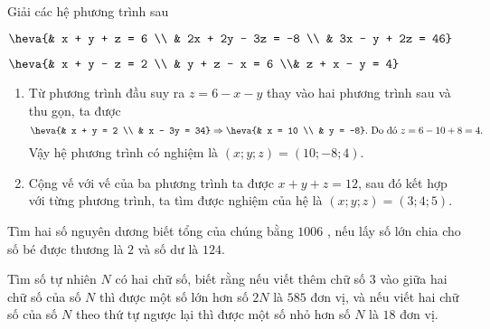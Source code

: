 \begin{bt}%
	Giải các hệ phương trình sau
	\begin{enumEX}{2}
	\item $\heva{& x + y + z = 6 \\ & 2x + 2y - 3z = -8 \\ & 3x - y + 2z = 46}$
	\item $\heva{& x + y - z = 2 \\ & y + z - x = 6 \\& z + x - y = 4}$
	\end{enumEX}	
	\loigiai
	{
	\begin{enumerate}
	\item Từ phương trình đầu suy ra $z = 6 - x - y$ thay vào hai phương trình sau và thu gọn, ta được $$\heva{& x + y = 2 \\ & x - 3y = 34} \Rightarrow \heva{& x = 10 \\ & y = -8}. \text{ Do đó }z = 6 - 10 + 8 = 4.$$
	Vậy hệ phương trình có nghiệm là $(x; y; z) = (10; -8; 4)$.
	\item Cộng vế với vế của ba phương trình ta được $x + y + z = 12$, sau đó kết hợp với từng phương trình, ta tìm được nghiệm của hệ là $(x; y; z) = (3; 4; 5)$. 
	\end{enumerate}
	}
\end{bt}
\begin{bt}
	Tìm hai số nguyên dương biết tổng của chúng bằng $1006$ , nếu lấy số lớn chia cho số bé được thương là $2$ và số dư là $124$.
\end{bt}
\begin{bt}
	Tìm số tự nhiên $N$ có hai chữ số, biết rằng nếu viết thêm chữ số $3$ vào giữa hai chữ số của số $N$ thì được một số lớn hơn số $2N$ là $585$ đơn vị, và nếu viết hai chữ số của số $N$ theo thứ tự ngược lại thì được một số nhỏ hơn số $N$ là $18$ đơn vị.
\end{bt}
